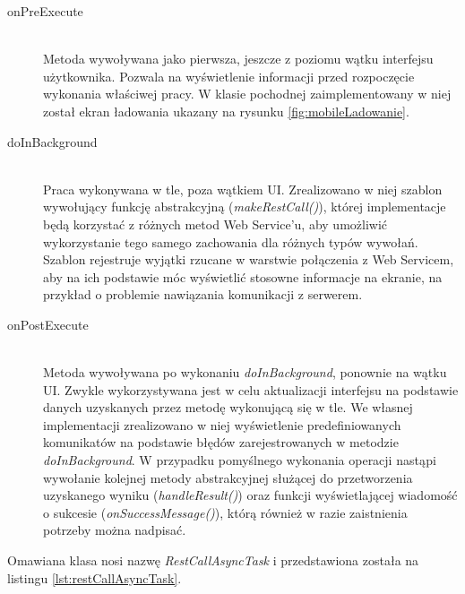 \documentclass[11pt]{aghdpl}
\begin{document}
\begin{description}
	\item[onPreExecute] \hfill \\
	Metoda wywoływana jako pierwsza, jeszcze z poziomu wątku interfejsu użytkownika. Pozwala na wyświetlenie informacji przed rozpoczęcie wykonania właściwej pracy. W klasie pochodnej zaimplementowany w niej został ekran ładowania ukazany na rysunku \ref{fig:mobileLadowanie}.
	\item[doInBackground] \hfill \\
	Praca wykonywana w tle, poza wątkiem UI. Zrealizowano w niej szablon wywołujący funkcję abstrakcyjną (\emph{makeRestCall()}), której implementacje będą korzystać z różnych metod Web Service'u, aby umożliwić wykorzystanie tego samego zachowania dla różnych typów wywołań. Szablon rejestruje wyjątki rzucane w warstwie połączenia z Web Servicem, aby na ich podstawie móc wyświetlić stosowne informacje na ekranie, na przykład o problemie nawiązania komunikacji z serwerem.
	\item[onPostExecute] \hfill \\
	Metoda wywoływana po wykonaniu \emph{doInBackground}, ponownie na wątku UI. Zwykle wykorzystywana jest w celu aktualizacji interfejsu na podstawie danych uzyskanych przez metodę wykonującą się w tle. We własnej implementacji zrealizowano w niej wyświetlenie predefiniowanych komunikatów na podstawie błędów zarejestrowanych w metodzie \emph{doInBackground}. W przypadku pomyślnego wykonania operacji nastąpi wywołanie kolejnej metody abstrakcyjnej służącej do przetworzenia uzyskanego wyniku (\emph{handleResult()}) oraz funkcji wyświetlającej wiadomość o sukcesie (\emph{onSuccessMessage()}), którą również w razie zaistnienia potrzeby można nadpisać.
\end{description}

Omawiana klasa nosi nazwę \emph{RestCallAsyncTask} i przedstawiona została na listingu \ref{lst:restCallAsyncTask}.
\end{document}
